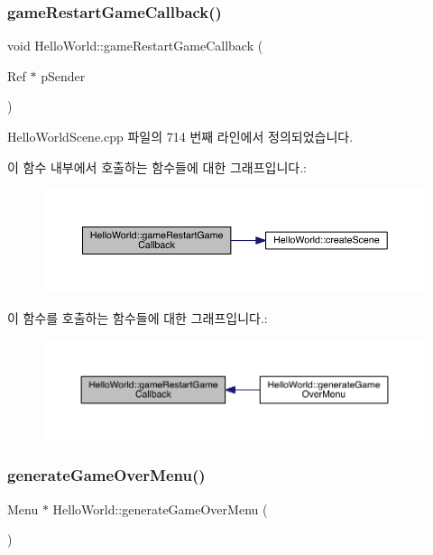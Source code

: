 \subsubsection{\texorpdfstring{game\+Restart\+Game\+Callback()}{gameRestartGameCallback()}}
{\footnotesize\ttfamily void Hello\+World\+::game\+Restart\+Game\+Callback (\begin{DoxyParamCaption}\item[{Ref $\ast$}]{p\+Sender }\end{DoxyParamCaption})}



Hello\+World\+Scene.\+cpp 파일의 714 번째 라인에서 정의되었습니다.

이 함수 내부에서 호출하는 함수들에 대한 그래프입니다.\+:
\nopagebreak
\begin{figure}[H]
\begin{center}
\leavevmode
\includegraphics[width=350pt]{class_hello_world_a73ad0d041144a1e610534fe5df41d556_cgraph}
\end{center}
\end{figure}
이 함수를 호출하는 함수들에 대한 그래프입니다.\+:
\nopagebreak
\begin{figure}[H]
\begin{center}
\leavevmode
\includegraphics[width=350pt]{class_hello_world_a73ad0d041144a1e610534fe5df41d556_icgraph}
\end{center}
\end{figure}
\mbox{\label{class_hello_world_a7b22f04ccc721e47e59c4f5470768790}} 
\subsubsection{\texorpdfstring{generate\+Game\+Over\+Menu()}{generateGameOverMenu()}}
{\footnotesize\ttfamily Menu $\ast$ Hello\+World\+::generate\+Game\+Over\+Menu (\begin{DoxyParamCaption}{ }\end{DoxyParamCaption})\hspace{0.3cm}{\ttfamily [protected]}}

